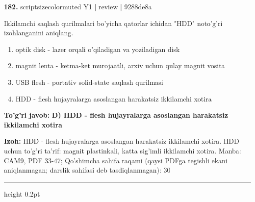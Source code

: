\documentclass[10pt,a4paper]{article}
\begin{document}
{\bfseries\sffamily\color{ink} 182.} {scriptsizecolor{muted} Y1 | review | 9288de8a}
\par
Ikkilamchi saqlash qurilmalari bo'yicha qatorlar ichidan "HDD" noto'g'ri izohlanganini aniqlang.
\begin{enumerate}[label=\Alph*),leftmargin=9mm]
\item optik disk - lazer orqali o'qiladigan va yoziladigan disk
\item magnit lenta - ketma-ket murojaatli, arxiv uchun qulay magnit vosita
\item USB flesh - portativ solid-state saqlash qurilmasi
\item HDD - flesh hujayralarga asoslangan harakatsiz ikkilamchi xotira
\end{enumerate}
\begin{tcolorbox}[enhanced,breakable,colback=teal!4,colframe=teal!60!black,boxrule=0.45pt,arc=1.2mm,left=2.7mm,right=2.7mm,top=1.8mm,bottom=1.8mm,before skip=2mm,after skip=2mm]
{\bfseries\sffamily\color{teal}To'g'ri javob:} \textbf{D) HDD - flesh hujayralarga asoslangan harakatsiz ikkilamchi xotira}
\par\smallskip
{\bfseries Izoh:} HDD - flesh hujayralarga asoslangan harakatsiz ikkilamchi xotira. HDD uchun to'g'ri ta'rif: magnit plastinkali, katta sig'imli ikkilamchi xotira. Manba: CAM9, PDF 33-47; Qo'shimcha sahifa raqami (qaysi PDFga tegishli ekani aniqlanmagan; darslik sahifasi deb tasdiqlanmagan): 30
\end{tcolorbox}
\vspace{2mm}\hrule height 0.2pt\vspace{3mm}
\end{document}
